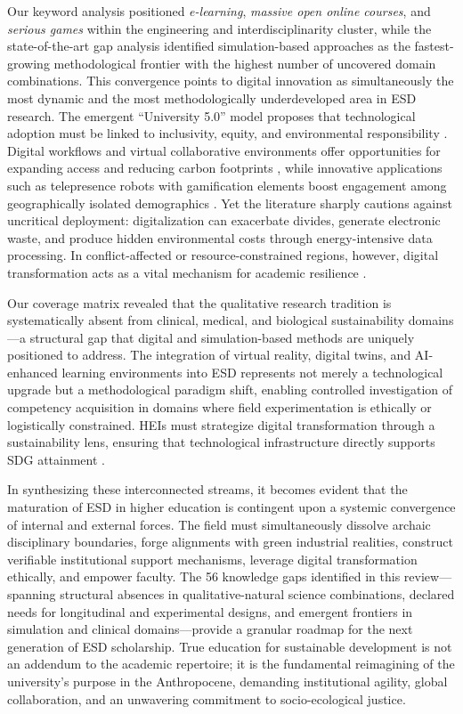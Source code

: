 \documentclass[pdflatex,sn-basic]{sn-jnl}%
\begin{document}
Our keyword analysis positioned \textit{e-learning}, \textit{massive open online courses}, and \textit{serious games} within the engineering and interdisciplinarity cluster, while the state-of-the-art gap analysis identified simulation-based approaches as the fastest-growing methodological frontier with the highest number of uncovered domain combinations. This convergence points to digital innovation as simultaneously the most dynamic and the most methodologically underdeveloped area in ESD research. The emergent ``University 5.0'' model proposes that technological adoption must be linked to inclusivity, equity, and environmental responsibility \cite{morales-arevalo_strategic_2025}. Digital workflows and virtual collaborative environments offer opportunities for expanding access and reducing carbon footprints \cite{gavrus_role_2025, eisinger_balassa_sustainable_2026}, while innovative applications such as telepresence robots with gamification elements boost engagement among geographically isolated demographics \cite{addas_enhancing_2024}. Yet the literature sharply cautions against uncritical deployment: digitalization can exacerbate divides, generate electronic waste, and produce hidden environmental costs through energy-intensive data processing. In conflict-affected or resource-constrained regions, however, digital transformation acts as a vital mechanism for academic resilience \cite{al-shaer_digital_2025}.

Our coverage matrix revealed that the qualitative research tradition is systematically absent from clinical, medical, and biological sustainability domains---a structural gap that digital and simulation-based methods are uniquely positioned to address. The integration of virtual reality, digital twins, and AI-enhanced learning environments into ESD represents not merely a technological upgrade but a methodological paradigm shift, enabling controlled investigation of competency acquisition in domains where field experimentation is ethically or logistically constrained. HEIs must strategize digital transformation through a sustainability lens, ensuring that technological infrastructure directly supports SDG attainment \cite{trevisan_digital_2024}.

In synthesizing these interconnected streams, it becomes evident that the maturation of ESD in higher education is contingent upon a systemic convergence of internal and external forces. The field must simultaneously dissolve archaic disciplinary boundaries, forge alignments with green industrial realities, construct verifiable institutional support mechanisms, leverage digital transformation ethically, and empower faculty. The 56 knowledge gaps identified in this review---spanning structural absences in qualitative-natural science combinations, declared needs for longitudinal and experimental designs, and emergent frontiers in simulation and clinical domains---provide a granular roadmap for the next generation of ESD scholarship. True education for sustainable development is not an addendum to the academic repertoire; it is the fundamental reimagining of the university's purpose in the Anthropocene, demanding institutional agility, global collaboration, and an unwavering commitment to socio-ecological justice.
\end{document}

